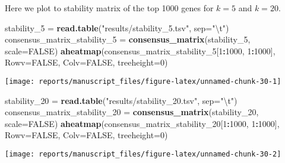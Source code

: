 \documentclass[9pt,a4paper,]{extarticle}
\newenvironment{Shaded}{\begin{snugshade}}{\end{snugshade}}
\newcommand{\CharTok}[1]{\textcolor[rgb]{0.31,0.60,0.02}{#1}}
\newcommand{\DataTypeTok}[1]{\textcolor[rgb]{0.13,0.29,0.53}{#1}}
\newcommand{\DecValTok}[1]{\textcolor[rgb]{0.00,0.00,0.81}{#1}}
\newcommand{\KeywordTok}[1]{\textcolor[rgb]{0.13,0.29,0.53}{\textbf{#1}}}
\newcommand{\NormalTok}[1]{#1}
\newcommand{\OperatorTok}[1]{\textcolor[rgb]{0.81,0.36,0.00}{\textbf{#1}}}
\newcommand{\OtherTok}[1]{\textcolor[rgb]{0.56,0.35,0.01}{#1}}
\newcommand{\StringTok}[1]{\textcolor[rgb]{0.31,0.60,0.02}{#1}}
\begin{document}
Here we plot to stability matrix of the top 1000 genes for \(k=5\) and \(k=20\).

\begin{Shaded}
\begin{Highlighting}[]
\NormalTok{stability_}\DecValTok{5}\NormalTok{ =}\StringTok{ }\KeywordTok{read.table}\NormalTok{(}\StringTok{"results/stability_5.tsv"}\NormalTok{, }\DataTypeTok{sep=}\StringTok{"}\CharTok{\textbackslash{}t}\StringTok{"}\NormalTok{)}
\NormalTok{consensus_matrix_stability_}\DecValTok{5}\NormalTok{ =}\StringTok{ }\KeywordTok{consensus_matrix}\NormalTok{(stability_}\DecValTok{5}\NormalTok{,}
                            \DataTypeTok{scale=}\OtherTok{FALSE}\NormalTok{)}
\KeywordTok{aheatmap}\NormalTok{(consensus_matrix_stability_}\DecValTok{5}\NormalTok{[}\DecValTok{1}\OperatorTok{:}\DecValTok{1000}\NormalTok{, }\DecValTok{1}\OperatorTok{:}\DecValTok{1000}\NormalTok{], }\DataTypeTok{Rowv=}\OtherTok{FALSE}\NormalTok{,}
     \DataTypeTok{Colv=}\OtherTok{FALSE}\NormalTok{,}
     \DataTypeTok{treeheight=}\DecValTok{0}\NormalTok{)}
\end{Highlighting}
\end{Shaded}

\begin{center}\texttt{[image: reports/manuscript\_files/figure-latex/unnamed-chunk-30-1]} \end{center}

\begin{Shaded}
\begin{Highlighting}[]
\NormalTok{stability_}\DecValTok{20}\NormalTok{ =}\StringTok{ }\KeywordTok{read.table}\NormalTok{(}\StringTok{"results/stability_20.tsv"}\NormalTok{, }\DataTypeTok{sep=}\StringTok{"}\CharTok{\textbackslash{}t}\StringTok{"}\NormalTok{)}
\NormalTok{consensus_matrix_stability_}\DecValTok{20}\NormalTok{ =}\StringTok{ }\KeywordTok{consensus_matrix}\NormalTok{(stability_}\DecValTok{20}\NormalTok{,}
                         \DataTypeTok{scale=}\OtherTok{FALSE}\NormalTok{)}
\KeywordTok{aheatmap}\NormalTok{(consensus_matrix_stability_}\DecValTok{20}\NormalTok{[}\DecValTok{1}\OperatorTok{:}\DecValTok{1000}\NormalTok{, }\DecValTok{1}\OperatorTok{:}\DecValTok{1000}\NormalTok{], }\DataTypeTok{Rowv=}\OtherTok{FALSE}\NormalTok{,}
     \DataTypeTok{Colv=}\OtherTok{FALSE}\NormalTok{,}
     \DataTypeTok{treeheight=}\DecValTok{0}\NormalTok{)}
\end{Highlighting}
\end{Shaded}

\begin{center}\texttt{[image: reports/manuscript\_files/figure-latex/unnamed-chunk-30-2]} \end{center}
\end{document}
